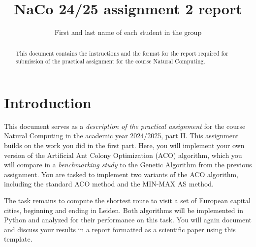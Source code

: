 \documentclass[runningheads]{llncs}
\begin{document}
%
\title{NaCo 24/25 assignment 2 report}

\author{First and last name of each student in the group}
%

%
\maketitle %
%

\begin{abstract}
This document contains the instructions and the format for the report required for submission of the practical assignment for the course Natural Computing. 
\end{abstract}

\section{Introduction}
This document serves as a \textit{description of the practical assignment} for the course Natural Computing in the academic year 2024/2025, part II. This assignment builds on the work you did in the first part. Here, you will implement your own version of the Artificial Ant Colony Optimization (ACO) algorithm, which you will compare in a \emph{benchmarking study} to the Genetic Algorithm from the previous assignment. You are tasked to implement two variants of the ACO algorithm, including the standard ACO method and the MIN-MAX AS method. 

The task remains to compute the shortest route to visit a set of European capital cities, beginning and ending in Leiden. Both algorithms will be implemented in Python and analyzed for their performance on this task. You will again document and discuss your results in a report formatted as a scientific paper using this template.

\end{document}
